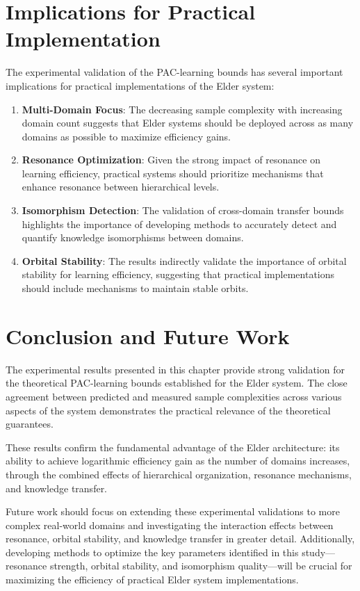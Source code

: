 \section{Implications for Practical Implementation}

The experimental validation of the PAC-learning bounds has several important implications for practical implementations of the Elder system:

\begin{enumerate}
    \item \textbf{Multi-Domain Focus}: The decreasing sample complexity with increasing domain count suggests that Elder systems should be deployed across as many domains as possible to maximize efficiency gains.
    
    \item \textbf{Resonance Optimization}: Given the strong impact of resonance on learning efficiency, practical systems should prioritize mechanisms that enhance resonance between hierarchical levels.
    
    \item \textbf{Isomorphism Detection}: The validation of cross-domain transfer bounds highlights the importance of developing methods to accurately detect and quantify knowledge isomorphisms between domains.
    
    \item \textbf{Orbital Stability}: The results indirectly validate the importance of orbital stability for learning efficiency, suggesting that practical implementations should include mechanisms to maintain stable orbits.
\end{enumerate}

\section{Conclusion and Future Work}

The experimental results presented in this chapter provide strong validation for the theoretical PAC-learning bounds established for the Elder system. The close agreement between predicted and measured sample complexities across various aspects of the system demonstrates the practical relevance of the theoretical guarantees.

These results confirm the fundamental advantage of the Elder architecture: its ability to achieve logarithmic efficiency gain as the number of domains increases, through the combined effects of hierarchical organization, resonance mechanisms, and knowledge transfer.

Future work should focus on extending these experimental validations to more complex real-world domains and investigating the interaction effects between resonance, orbital stability, and knowledge transfer in greater detail. Additionally, developing methods to optimize the key parameters identified in this study—resonance strength, orbital stability, and isomorphism quality—will be crucial for maximizing the efficiency of practical Elder system implementations.